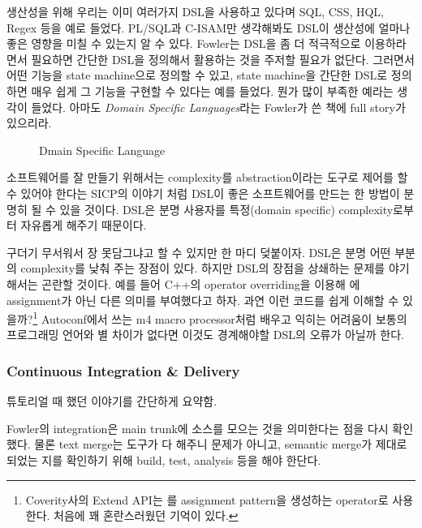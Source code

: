 \documentclass[11pt]{article}
\begin{document}
생산성을 위해 우리는 이미 여러가지 DSL을 사용하고 있다며
SQL, CSS, HQL, Regex 등을 예로 들었다.
PL/SQL과 C-ISAM만 생각해봐도 DSL이 생산성에 얼마나 좋은 영향을 미칠 수 있는지
알 수 있다. Fowler는 DSL을 좀 더 적극적으로 이용하라면서 필요하면 간단한
DSL을 정의해서 활용하는 것을 주저할 필요가 없단다. 그러면서
어떤 기능을 state machine으로 정의할 수 있고, state machine을 간단한 DSL로
정의하면 매우 쉽게 그 기능을 구현할 수 있다는 예를 들었다. 뭔가 많이 부족한
예라는 생각이 들었다.
아마도 \textit{Domain Specific Languages}\cite{fowler}라는 Fowler가 쓴 책에 
full story가 있으리라.

\begin{figure}[t]
    \begin{Frame}
        \begin{center}
        \end{center}
    \end{Frame}
    \caption{Dmain Specific Language}
    \label{dsl}
\end{figure}
 
소프트웨어를 잘 만들기 위해서는 complexity를 abstraction이라는 도구로
제어를 할 수 있어야 한다는 SICP의 이야기\cite{sicp} 처럼 DSL이 좋은 
소프트웨어를 만드는 한 방법이 분명히 될 수 있을 것이다. DSL은 분명 사용자를
특정(domain specific) complexity로부터 자유롭게 해주기 때문이다.

 
구더기 무서워서 장 못담그냐고 할 수 있지만 한 마디 덪붙이자. DSL은 분명
어떤 부분의 complexity를 낮춰 주는 장점이 있다. 하지만  DSL의 장점을 상쇄하는
문제를 야기해서는 곤란할 것이다. 예를 들어 C++의 operator overriding을 이용해 
\mbtt{=}에 assignment가 아닌 다른 의미를 부여했다고 하자. 과연 이런 코드를 쉽게 
이해할 수 있을까?\footnote{Coverity사의 Extend API는 \mbtt{=}를 assignment
pattern을 생성하는 operator로 사용한다. 처음에 꽤 혼란스러웠던 기억이 있다.}
Autoconf에서 쓰는 m4 macro processor처럼 배우고 익히는 어려움이 보통의 
프로그래밍 언어와 별 차이가 없다면 이것도 경계해야할 DSL의 오류가 아닐까 한다.


\subsubsection{Continuous Integration \& Delivery}
 
튜토리얼 때 했던 이야기를 간단하게 요약함. 
 
Fowler의 integration은 main trunk에 소스를 모으는 것을 의미한다는 점을
다시 확인했다. 물론 text merge는 도구가 다 해주니 문제가 아니고,
semantic merge가 제대로 되었는 지를 확인하기 위해 build, test,
analysis 등을 해야 한단다.
 
\end{document}
